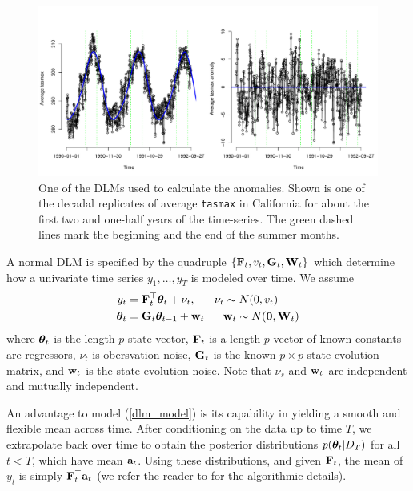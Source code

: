 \begin{figure}
\begin{center}
\includegraphics[scale=0.50]{figs/dlm.pdf}
\end{center}
\caption{One of the DLMs used to calculate the anomalies. Shown is one of the decadal replicates of average \texttt{tasmax} in California for about the first two and one-half years of the time-series. The green dashed lines mark the beginning and the end of the summer months.}
\label{dlm_fig}
\end{figure}


A normal DLM is specified by the quadruple $\{\mathbf{\bm{F}}_t, v_t, \mathbf{\bm{G}}_t, \mathbf{\bm{W}}_t\}$ which determine how a univariate time series $y_1,\ldots,y_T$ is modeled over time. We assume
\begin{align}
y_t &= \mathbf{\bm{F}}_t^\top\mathbf{\bm{\theta}}_t + \nu_t,~~~~~\nu_t\sim N(0, v_t) \label{dlm_model} \\
\mathbf{\bm{\theta}}_t &= \mathbf{\bm{G}}_t\mathbf{\bm{\theta}}_{t-1}+\mathbf{\bm{w}}_t~~~~~\mathbf{\bm{w}}_t\sim N(\mathbf{\bm{0}}, \mathbf{\bm{W}}_t) \nonumber
\end{align}
where $\mathbf{\bm{\theta}}_t$ is the length-$p$ state vector, $\mathbf{\bm{F}}_t$ is a length $p$ vector of known constants are regressors, $\nu_t$ is obersvation noise, $\mathbf{\bm{G}}_t$ is the known $p\times p$ state evolution matrix, and $\mathbf{\bm{w}}_t$ is the state evolution noise. Note that $\nu_s$ and $\mathbf{\bm{w}}_t$ are independent and mutually independent.

An advantage to model (\ref{dlm_model}) is its capability in yielding a smooth and flexible mean across time. After conditioning on the data up to time $T$, we extrapolate back over time to obtain the posterior distributions $p(\mathbf{\bm{\theta}}_t|D_T)$ for all $t<T$, which have mean $\mathbf{\bm{a}}_t$. Using these distributions, and given $\mathbf{\bm{F}}_t$, the mean of $y_t$ is simply $\mathbf{\bm{F}}_t^\top\mathbf{\bm{a}}_t$ (we refer the reader to \cite{prado2010time} for the algorithmic details).

